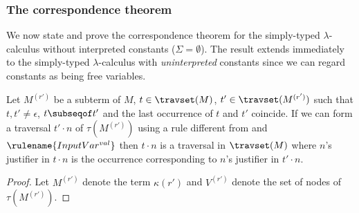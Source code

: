 \subsubsection{The correspondence theorem}
We now state and prove the correspondence theorem for the
simply-typed $\lambda$-calculus without interpreted constants
($\Sigma = \emptyset$). The result extends immediately to the
simply-typed $\lambda$-calculus with \emph{uninterpreted} constants
since we can regard constants as being free variables.

\begin{lemma}
\label{lem:local_traversal_progression}
Let $M^{(r')}$ be a subterm of $M$, $t \in \travset(M)$,
$t' \in \travset(M^{(r')})$ such that $t,t' \neq \epsilon$, $t\subseqof t'$
and the last occurrence of $t$ and $t'$ coincide.
If we can form a traversal $t' \cdot n$ of $\tau(M^{(r')})$ using a rule different from  and $\rulename{InputVar^{val}}$ then
$ t \cdot n$ is a traversal in $\travset(M)$
where $n$'s justifier in $t \cdot n$ is the occurrence corresponding
to $n$'s justifier in $t' \cdot n$.
\end{lemma}
\begin{proof}
  Let $M^{(r')}$ denote the term $\kappa(r')$ and
  $V^{(r')}$ denote the set of nodes of $\tau(M^{(r')})$.

\end{proof}


